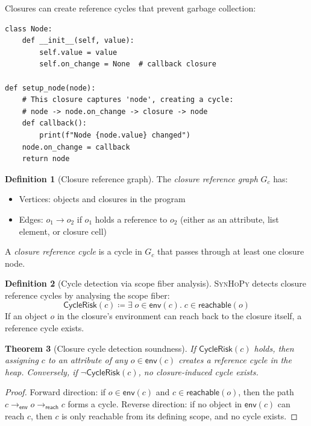 \documentclass[11pt,a4paper]{report}
\theoremstyle{definition}
\newtheorem{definition}{Definition}[chapter]
\theoremstyle{plain}
\newtheorem{theorem}[definition]{Theorem}
\newcommand{\defeq}{\coloneqq}
\newcommand{\synhopy}{\textsc{SynHoPy}}
\begin{document}
Closures can create reference cycles that prevent garbage collection:

\begin{lstlisting}[style=python]
class Node:
    def __init__(self, value):
        self.value = value
        self.on_change = None  # callback closure

def setup_node(node):
    # This closure captures 'node', creating a cycle:
    # node -> node.on_change -> closure -> node
    def callback():
        print(f"Node {node.value} changed")
    node.on_change = callback
    return node
\end{lstlisting}

\begin{definition}[Closure reference graph]
The \emph{closure reference graph} $G_c$ has:
\begin{itemize}
  \item Vertices: objects and closures in the program
  \item Edges: $o_1 \to o_2$ if $o_1$ holds a reference to $o_2$
    (either as an attribute, list element, or closure cell)
\end{itemize}
A \emph{closure reference cycle} is a cycle in $G_c$ that passes through
at least one closure node.
\end{definition}

\begin{definition}[Cycle detection via scope fiber analysis]
\synhopy{} detects closure reference cycles by analysing the scope fiber:
\[
  \mathsf{CycleRisk}(c) \defeq
    \exists\; o \in \mathsf{env}(c).\;
    c \in \mathsf{reachable}(o)
\]
If an object $o$ in the closure's environment can reach back to the closure
itself, a reference cycle exists.
\end{definition}

\begin{theorem}[Closure cycle detection soundness]
If $\mathsf{CycleRisk}(c)$ holds, then assigning $c$ to an attribute
of any $o \in \mathsf{env}(c)$ creates a reference cycle in the heap.
Conversely, if $\neg\mathsf{CycleRisk}(c)$, no closure-induced cycle
exists.
\end{theorem}
\begin{proof}
Forward direction: if $o \in \mathsf{env}(c)$ and $c \in
\mathsf{reachable}(o)$, then the path $c \to_{\mathsf{env}} o
\to_{\mathsf{reach}} c$ forms a cycle.
Reverse direction: if no object in $\mathsf{env}(c)$ can reach $c$,
then $c$ is only reachable from its defining scope, and no cycle exists.
\end{proof}
\end{document}
